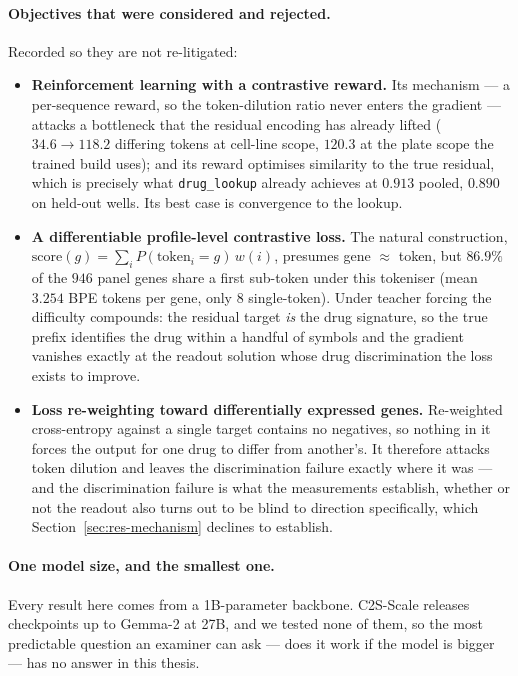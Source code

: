 \paragraph{Objectives that were considered and rejected.} Recorded so they are not re-litigated:
\begin{itemize}
  \item \textbf{Reinforcement learning with a contrastive reward.} Its mechanism --- a per-sequence
        reward, so the token-dilution ratio never enters the gradient --- attacks a bottleneck that
        the residual encoding has already lifted ($34.6 \rightarrow 118.2$ differing tokens at
        cell-line scope, $120.3$ at the plate scope the trained build uses); and its
        reward optimises similarity to the true residual, which is precisely what
        \texttt{drug\_lookup} already achieves at $0.913$ pooled, $0.890$ on held-out wells. Its
        best case is convergence to the lookup.
  \item \textbf{A differentiable profile-level contrastive loss.} The natural construction,
        $\textrm{score}(g) = \sum_i P(\textrm{token}_i = g)\,w(i)$, presumes gene $\approx$ token,
        but $86.9\%$ of the $946$ panel genes share a first sub-token under this tokeniser (mean
        $3.254$ BPE tokens per gene, only 8 single-token). Under teacher forcing the difficulty
        compounds: the residual target \emph{is} the drug signature, so the true prefix identifies
        the drug within a handful of symbols and the gradient vanishes exactly at the
        readout solution whose drug discrimination the loss exists to improve.
  \item \textbf{Loss re-weighting toward differentially expressed genes.} Re-weighted cross-entropy
        against a single target contains no negatives, so nothing in it forces the output for one
        drug to differ from another's. It therefore attacks token dilution and leaves the
        discrimination failure exactly where it was --- and the discrimination failure is what the
        measurements establish, whether or not the readout also turns out to be blind to direction
        specifically, which Section~\ref{sec:res-mechanism} declines to establish.
\end{itemize}

\paragraph{One model size, and the smallest one.} Every result here comes from a 1B-parameter
backbone. C2S-Scale releases checkpoints up to Gemma-2 at 27B, and we tested none of them, so the
most predictable question an examiner can ask --- does it work if the model is bigger --- has no
answer in this thesis.

